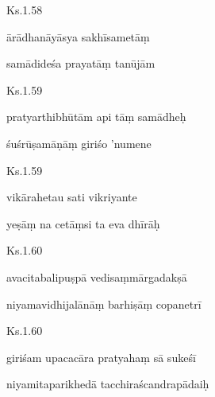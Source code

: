 \documentclass{tufte-handout}
\newenvironment{sanskrit}%
{\begin{otherlanguage}{sanskrit-devanagari}}%
{\end{otherlanguage}}
\begin{document}
    
	\begin{sanskrit}
	
	    
		Ks.1.58 
    
	    
		ārādhanāyāsya sakhīsametāṃ 
    
	    
		samādideśa prayatāṃ tanūjām 
    
	\end{sanskrit}

    
	\begin{sanskrit}
	
	    
		Ks.1.59 
    
	    
		pratyarthibhūtām api tāṃ samādheḥ 
    
	    
		śuśrūṣamāṇāṃ giriśo 'numene 
    
	\end{sanskrit}

    
	\begin{sanskrit}
	
	    
		Ks.1.59 
    
	    
		vikārahetau sati vikriyante 
    
	    
		yeṣāṃ na cetāṃsi ta eva dhīrāḥ 
    
	\end{sanskrit}

    
	\begin{sanskrit}
	
	    
		Ks.1.60 
    
	    
		avacitabalipuṣpā vedisaṃmārgadakṣā 
    
	    
		niyamavidhijalānāṃ barhiṣāṃ copanetrī 
    
	\end{sanskrit}

    
	\begin{sanskrit}
	
	    
		Ks.1.60 
    
	    
		giriśam upacacāra pratyahaṃ sā sukeśī 
    
	    
		niyamitaparikhedā tacchiraścandrapādaiḥ 
    
	\end{sanskrit}
\end{document}
